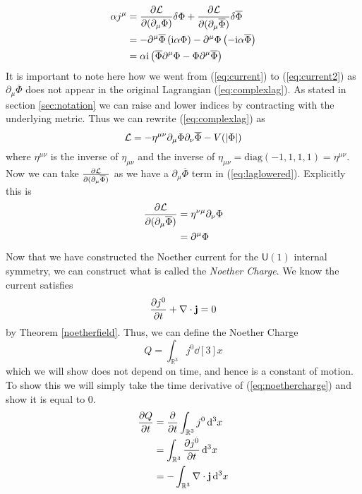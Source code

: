 \begin{align}
\alpha j^\mu & = \pdv{\mathcal{L}}{(\partial_\mu\Phi)}\delta\Phi + \pdv{\mathcal{L}}{(\partial_\mu\overline{\Phi})}\delta\overline{\Phi} \label{eq:current} \\
 & = -\partial^\mu\overline{\Phi}\left(\mathrm{i}\alpha\Phi\right) - \partial^\mu\Phi\left(-\mathrm{i}\alpha\overline{\Phi}\right) \label{eq:current2}\\
 & = \alpha\mathrm{i}\left(\overline{\Phi}\partial^\mu\Phi - \Phi\partial^\mu\overline{\Phi}\right)
\end{align}
It is important to note here how we went from (\ref{eq:current}) to (\ref{eq:current2}) as $\partial_\mu\overline{\Phi}$ does not appear in the original Lagrangian (\ref{eq:complexlag}). As stated in section \ref{sec:notation} we can raise and lower indices by contracting with the underlying metric. Thus we can rewrite (\ref{eq:complexlag}) as
\begin{equation}\label{eq:laglowered}
\mathcal{L} = -\eta^{\mu\nu}\partial_\mu\Phi\partial_\nu\overline{\Phi} - V(|\Phi|)
\end{equation}
where $\eta^{\mu\nu}$ is the inverse of $\eta_{\mu\nu}$ and the inverse of $\eta_{\mu\nu} = \mathrm{diag}(-1,1,1,1) = \eta^{\mu\nu}$. Now we can take $\pdv{\mathcal{L}}{(\partial_\mu\overline{\Phi})}$ as we have a $\partial_\mu\overline{\Phi}$ term in (\ref{eq:laglowered}). Explicitly this is
\begin{align}
\pdv{\mathcal{L}}{(\partial_\mu\overline{\Phi})} & = \eta^{\nu\mu}\partial_\nu\Phi \\
 & = \partial^\mu\Phi
\end{align}
Now that we have constructed the Noether current for the $\mathsf{U}(1)$ internal symmetry, we can construct what is called the \textit{Noether Charge}. We know the current satisfies
\begin{equation}
\pdv{j^0}{t} + \nabla\cdot\mathbf{j} = 0
\end{equation}
by Theorem \ref{noetherfield}. Thus, we can define the Noether Charge
\begin{equation}\label{eq:noethercharge}
Q = \int_{\mathbb{R}^3}j^0\dd[3]{x}
\end{equation}
which we will show does not depend on time, and hence is a constant of motion. To show this we will simply take the time derivative of (\ref{eq:noethercharge}) and show it is equal to 0.
\begin{align}
\pdv{Q}{t} & = \pdv{t}\int_{\mathbb{R}^3}j^0\dd[3]{x} \\
 & = \int_{\mathbb{R}^3}\pdv{j^0}{t}\dd[3]{x} \\
 & = -\int_{\mathbb{R}^3}\nabla\cdot\mathbf{j}\dd[3]{x}
\end{align}
